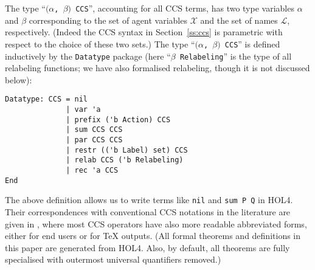 \documentclass[GCNS]{yincog}
\renewcommand{\HOLinline}[1]{\mbox{\textup{\texttt{#1}}}}
\renewcommand{\HOLTyOp}[1]{\texttt{#1}}
\theoremstyle{remark}
\theoremstyle{theorem}
\theoremstyle{remark}
\begin{document}
The type ``\HOLinline{\ensuremath{(}\ensuremath{\alpha}, \ensuremath{\beta}\ensuremath{)} \HOLTyOp{CCS}}'',
accounting for all CCS terms, has two type variables $\alpha $ and
$\beta $ corresponding to the set of agent variables $\mathscr{X}$ and
the set of names $\mathscr{L}$, respectively. (Indeed the CCS syntax in
Section~\ref{ss:ccs} is parametric with respect to the choice of these
two sets.) The type ``\HOLinline{\ensuremath{(}\ensuremath{\alpha}, \ensuremath{\beta}\ensuremath{)} \HOLTyOp{CCS}}''
is defined inductively by the \texttt{Datatype} package (here ``\HOLinline{\ensuremath{\beta} \HOLTyOp{Relabeling}}''
is the type of all relabeling functions; we have also formalised relabeling,
though it is not discussed below):
%
\begin{lstlisting}
Datatype: CCS = nil
              | var 'a
              | prefix ('b Action) CCS
              | sum CCS CCS
              | par CCS CCS
              | restr (('b Label) set) CCS
              | relab CCS ('b Relabeling)
              | rec 'a CCS
End
\end{lstlisting} The above definition allows us to write terms like
\texttt{nil} and \texttt{sum P Q} in HOL4. Their correspondences with conventional
CCS notations in the literature are given in ,
where most CCS operators have also more readable abbreviated forms, either
for end users or for \TeX{} outputs. (All formal theorems and definitions
in this paper are generated from HOL4. Also, by default, all theorems are
fully specialised with outermost universal quantifiers removed.)
\end{document}
